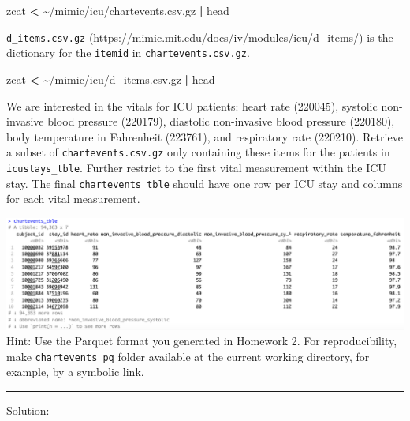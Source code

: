 \documentclass[
]{article}
\newenvironment{Shaded}{\begin{snugshade}}{\end{snugshade}}
\newcommand{\FunctionTok}[1]{\textcolor[rgb]{0.00,0.00,0.00}{#1}}
\newcommand{\KeywordTok}[1]{\textcolor[rgb]{0.13,0.29,0.53}{\textbf{#1}}}
\newcommand{\NormalTok}[1]{\textcolor[rgb]{0.00,0.00,0.00}{#1}}
\newcommand{\OperatorTok}[1]{\textcolor[rgb]{0.81,0.36,0.00}{\textbf{#1}}}
\begin{document}
\begin{Shaded}
\begin{Highlighting}[]
\FunctionTok{zcat} \OperatorTok{\textless{}}\NormalTok{ \textasciitilde{}/mimic/icu/chartevents.csv.gz }\KeywordTok{|} \FunctionTok{head}
\end{Highlighting}
\end{Shaded}

\texttt{d\_items.csv.gz}
(\url{https://mimic.mit.edu/docs/iv/modules/icu/d_items/}) is the
dictionary for the \texttt{itemid} in \texttt{chartevents.csv.gz}.

\begin{Shaded}
\begin{Highlighting}[]
\FunctionTok{zcat} \OperatorTok{\textless{}}\NormalTok{ \textasciitilde{}/mimic/icu/d\_items.csv.gz }\KeywordTok{|} \FunctionTok{head}
\end{Highlighting}
\end{Shaded}

We are interested in the vitals for ICU patients: heart rate (220045),
systolic non-invasive blood pressure (220179), diastolic non-invasive
blood pressure (220180), body temperature in Fahrenheit (223761), and
respiratory rate (220210). Retrieve a subset of
\texttt{chartevents.csv.gz} only containing these items for the patients
in \texttt{icustays\_tble}. Further restrict to the first vital
measurement within the ICU stay. The final \texttt{chartevents\_tble}
should have one row per ICU stay and columns for each vital measurement.

\includegraphics{images/clipboard-3810019433.png}Hint: Use the Parquet
format you generated in Homework 2. For reproducibility, make
\texttt{chartevents\_pq} folder available at the current working
directory, for example, by a symbolic link.

\begin{center}\rule{0.5\linewidth}{0.5pt}\end{center}

Solution:
\end{document}
